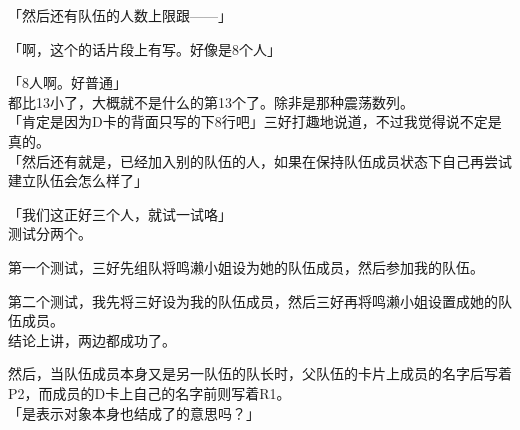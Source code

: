 「然后还有队伍的人数上限跟——」

「啊，这个的话片段上有写。好像是8个人」

「8人啊。好普通」\\

都比13小了，大概就不是什么的第13个了。除非是那种震荡数列。\\

「肯定是因为D卡的背面只写的下8行吧」三好打趣地说道，不过我觉得说不定是真的。\\

「然后还有就是，已经加入别的队伍的人，如果在保持队伍成员状态下自己再尝试建立队伍会怎么样了」

「我们这正好三个人，就试一试咯」\\

测试分两个。

第一个测试，三好先组队将鸣濑小姐设为她的队伍成员，然后参加我的队伍。

第二个测试，我先将三好设为我的队伍成员，然后三好再将鸣濑小姐设置成她的队伍成员。\\

结论上讲，两边都成功了。

然后，当队伍成员本身又是另一队伍的队长时，父队伍的卡片上成员的名字后写着P2，而成员的D卡上自己的名字前则写着R1。\\

「是表示对象本身也结成了的意思吗？」

